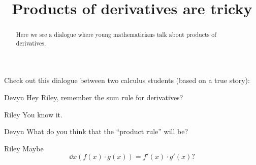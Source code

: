 \documentclass{ximera}
\title[Break-Ground:]{Products of derivatives are tricky}
\begin{document}
\begin{abstract}
Here we see a dialogue where young mathematicians talk about products
of derivatives.
\end{abstract}
\maketitle

Check out this dialogue between two calculus students (based on a true
story):

\begin{dialogue}
\item[Devyn] Hey Riley, remember the sum rule for derivatives?
\item[Riley] You know it.
\item[Devyn] What do you think that the ``product rule'' will be?
\item[Riley] Maybe
  \[
  \dd{x} \left(f(x)\cdot g(x)\right) = f'(x) \cdot g'(x)?
  \]
  
\end{dialogue}

\begin{problem}
\end{problem}


\end{document}
